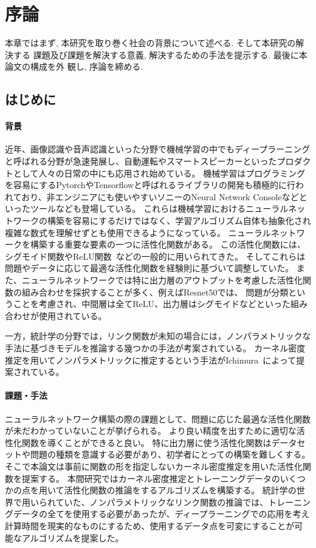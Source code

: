 \chapter{序論}
\label{introduction}

本章ではまず, 本研究を取り巻く社会の背景について述べる. そして本研究の解決する
課題及び課題を解決する意義, 解決するための手法を提示する. 最後に本論文の構成を外
観し, 序論を締める.

\section{はじめに}
\label{introduction:background}

\subsubsection{背景}


近年、画像認識や音声認識といった分野で機械学習の中でもディープラーニングと呼ばれる分野が急速発展し、自動運転やスマートスピーカーといったプロダクトとして人々の日常の中にも応用され始めている。
機械学習はプログラミングを容易にするPytorchやTensorflowと呼ばれるライブラリの開発も積極的に行われており、非エンジニアにも使いやすいソニーのNeural Network Consoleなどといったツールなども登場している。
これらは機械学習におけるニューラルネットワークの構築を容易にするだけではなく、学習アルゴリズム自体も抽象化され複雑な数式を理解せずとも使用できるようになっている。
ニューラルネットワークを構築する重要な要素の一つに活性化関数がある。
この活性化関数には、シグモイド関数やReLU関数~\cite{ReLU}などの一般的に用いられてきた。
そしてこれらは問題やデータに応じて最適な活性化関数を経験則に基づいて調整していた。
また、ニューラルネットワークでは特に出力層のアウトプットを考慮した活性化関数の組み合わせを採択することが多く、例えばResnet50では、
問題が分類ということを考慮され、中間層は全てReLU、出力層はシグモイドなどといった組み合わせが使用されている。

一方，統計学の分野では，リンク関数が未知の場合には，ノンパラメトリックな手法に基づきモデルを推論する幾つかの手法が考案されている。
カーネル密度推定を用いてノンパラメトリックに推定するという手法がIchimura~\cite{ichimura}によって提案されている。

\subsubsection{課題・手法}

ニューラルネットワーク構築の際の課題として、問題に応じた最適な活性化関数が未だわかっていないことが挙げられる。
より良い精度を出すために適切な活性化関数を導くことができると良い。
特に出力層に使う活性化関数はデータセットや問題の種類を意識する必要があり、初学者にとっての構築を難しくする。
そこで本論文は事前に関数の形を指定しないカーネル密度推定を用いた活性化関数を提案する。
本間研究ではカーネル密度推定とトレーニングデータのいくつかの点を用いて活性化関数の推論をするアルゴリズムを構築する。
統計学の世界で用いられていた、ノンパラメトリックなリンク関数の推論では、トレーニングデータの全てを使用する必要があったが、ディープラーニングでの応用を考え
計算時間を現実的なものにするため、使用するデータ点を可変にすることが可能なアルゴリズムを提案した。

